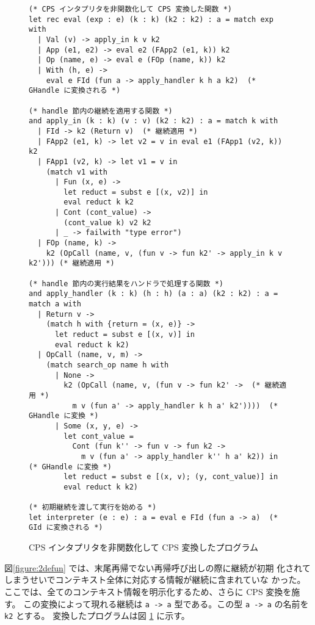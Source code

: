 \begin{figure}
  \begin{spacing}{0.8}
\begin{verbatim}
(* CPS インタプリタを非関数化して CPS 変換した関数 *)
let rec eval (exp : e) (k : k) (k2 : k2) : a = match exp with
  | Val (v) -> apply_in k v k2
  | App (e1, e2) -> eval e2 (FApp2 (e1, k)) k2
  | Op (name, e) -> eval e (FOp (name, k)) k2
  | With (h, e) ->
    eval e FId (fun a -> apply_handler k h a k2)  (* GHandle に変換される *)

(* handle 節内の継続を適用する関数 *)
and apply_in (k : k) (v : v) (k2 : k2) : a = match k with
  | FId -> k2 (Return v)  (* 継続適用 *)
  | FApp2 (e1, k) -> let v2 = v in eval e1 (FApp1 (v2, k)) k2
  | FApp1 (v2, k) -> let v1 = v in
    (match v1 with
      | Fun (x, e) ->
        let reduct = subst e [(x, v2)] in
        eval reduct k k2
      | Cont (cont_value) ->
        (cont_value k) v2 k2
      | _ -> failwith "type error")
  | FOp (name, k) ->
    k2 (OpCall (name, v, (fun v -> fun k2' -> apply_in k v k2'))) (* 継続適用 *)

(* handle 節内の実行結果をハンドラで処理する関数 *)
and apply_handler (k : k) (h : h) (a : a) (k2 : k2) : a = match a with
  | Return v ->
    (match h with {return = (x, e)} ->
      let reduct = subst e [(x, v)] in
      eval reduct k k2)
  | OpCall (name, v, m) ->
    (match search_op name h with
      | None ->
        k2 (OpCall (name, v, (fun v -> fun k2' ->  (* 継続適用 *)
          m v (fun a' -> apply_handler k h a' k2'))))  (* GHandle に変換 *)
      | Some (x, y, e) ->
        let cont_value =
          Cont (fun k'' -> fun v -> fun k2 ->
            m v (fun a' -> apply_handler k'' h a' k2)) in  (* GHandle に変換 *)
        let reduct = subst e [(x, v); (y, cont_value)] in
        eval reduct k k2)

(* 初期継続を渡して実行を始める *)
let interpreter (e : e) : a = eval e FId (fun a -> a)  (* GId に変換される *)
\end{verbatim}
\end{spacing}
\caption{CPS インタプリタを非関数化して CPS 変換したプログラム}
\label{figure:3cps}
\end{figure}

図\ref{figure:2defun} では、末尾再帰でない再帰呼び出しの際に継続が初期
化されてしまうせいでコンテキスト全体に対応する情報が継続に含まれていな
かった。
ここでは、全てのコンテキスト情報を明示化するため、さらに CPS 変換を施
す。
この変換によって現れる継続は \texttt{a -> a} 型である。この型
\texttt{a -> a} の名前を \texttt{k2} とする。
変換したプログラムは図 \ref{figure:3cps} に示す。

